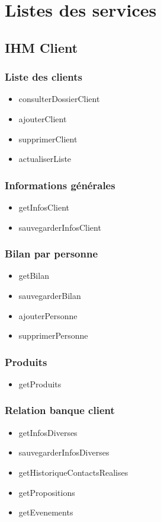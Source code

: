 \section{Listes des services}

	\subsection{IHM Client}
	
		\subsubsection*{Liste des clients}
		\begin{itemize}
		\item consulterDossierClient
		\item ajouterClient
		\item supprimerClient
		\item actualiserListe 
		\end{itemize}
	
		\subsubsection*{Informations générales}
		\begin{itemize}
		\item getInfosClient
		\item sauvegarderInfosClient
		\end{itemize}
		
		\subsubsection*{Bilan par personne}
		\begin{itemize}
		\item getBilan 
		\item sauvegarderBilan 
		\item ajouterPersonne 
		\item supprimerPersonne
		\end{itemize}
		
		\subsubsection*{Produits}
		\begin{itemize}
		\item getProduits
		\end{itemize}
		
		\subsubsection*{Relation banque client}
		\begin{itemize}
		\item getInfosDiverses
		\item sauvegarderInfosDiverses
		\item getHistoriqueContactsRealises
		\item getPropositions 
		\item getEvenements
		\end{itemize}
		
